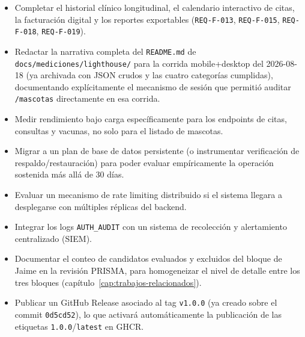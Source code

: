 \begin{itemize}[nosep]
  \item Completar el historial cl\'inico longitudinal, el calendario
    interactivo de citas, la facturaci\'on digital y los reportes
    exportables (\texttt{REQ-F-013}, \texttt{REQ-F-015}, \texttt{REQ-F-018},
    \texttt{REQ-F-019}).
  \item Redactar la narrativa completa del \texttt{README.md} de
    \texttt{docs/mediciones/lighthouse/} para la corrida mobile+desktop del
    2026-08-18 (ya archivada con JSON crudos y las cuatro categor\'ias
    cumplidas), documentando expl\'icitamente el mecanismo de sesi\'on que
    permiti\'o auditar \texttt{/mascotas} directamente en esa corrida.
  \item Medir rendimiento bajo carga espec\'ificamente para los endpoints
    de citas, consultas y vacunas, no solo para el listado de mascotas.
  \item Migrar a un plan de base de datos persistente (o instrumentar
    verificaci\'on de respaldo/restauraci\'on) para poder evaluar
    emp\'iricamente la operaci\'on sostenida m\'as all\'a de 30 d\'ias.
  \item Evaluar un mecanismo de rate limiting distribuido si el sistema
    llegara a desplegarse con m\'ultiples r\'eplicas del backend.
  \item Integrar los logs \texttt{AUTH\_AUDIT} con un sistema de
    recolecci\'on y alertamiento centralizado (SIEM).
  \item Documentar el conteo de candidatos evaluados y excluidos del
    bloque de Jaime en la revisi\'on PRISMA, para homogeneizar el nivel de
    detalle entre los tres bloques (cap\'itulo~\ref{cap:trabajos-relacionados}).
  \item Publicar un GitHub Release asociado al tag \texttt{v1.0.0} (ya
    creado sobre el commit \texttt{0d5cd52}), lo que activar\'a
    autom\'aticamente la publicaci\'on de las etiquetas
    \texttt{1.0.0}/\texttt{latest} en GHCR.
\end{itemize}

